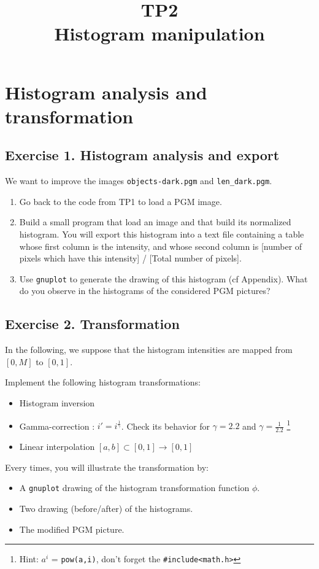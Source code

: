 \documentclass[a4paper, 11pt]{article}
\title{\bf{TP2 \\ Histogram manipulation}}
\author{}
\date{}
\begin{document}
\maketitle

\section*{\bf Histogram analysis and transformation}

\subsection*{\bf Exercise 1. \rm Histogram analysis and export}

\par We want to improve the images \texttt{objects-dark.pgm} and \texttt{len\_dark.pgm}.

\begin{enumerate}
	\item Go back to the code from TP1 to load a PGM image.
	\item Build a small program that load an image and that build its normalized histogram. You will export this histogram into a text file containing a table whose first column is the intensity, and whose second column is [number of pixels which have this intensity] / [Total number of pixels].
	\item Use \texttt{gnuplot} to generate the drawing of this histogram (cf Appendix). What do you observe in the histograms of the considered PGM pictures?
\end{enumerate}

\subsection*{\bf Exercise 2. \rm Transformation}

In the following, we suppose that the histogram intensities are mapped from $[0,M]$  to $[0,1]$.

\par Implement the following histogram transformations: 
	\begin{itemize}
		\item Histogram inversion
		\item Gamma-correction :  $i' = i^\frac{1}{\gamma}$. Check its behavior for $\gamma=2.2$ and $\gamma=\frac{1}{2.2}$ \footnote{Hint: $a^i$ = \texttt{pow(a,i)}, don't forget the \texttt{\#include<math.h>}}
		\item Linear interpolation $[a,b]\subset[0,1]\rightarrow [0,1]$
	\end{itemize}
Every times, you will illustrate the transformation by:
\begin{itemize}
	\item A \texttt{gnuplot} drawing of the histogram transformation function $\phi$.
	\item Two drawing (before/after) of the histograms.
	\item The modified PGM picture.
\end{itemize}
\end{document}
